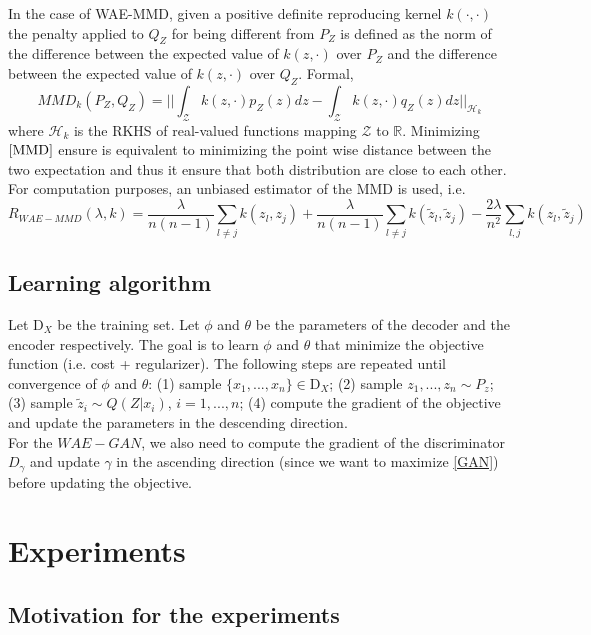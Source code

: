 \documentclass[12pt,english]{amsart}
\begin{document}
In the case of WAE-MMD, given a positive definite reproducing kernel $k(\cdot,\cdot)$ the penalty applied to $Q_Z$ for being different from $P_Z$ is defined as the norm of the difference between the expected value of $k(z,\cdot)$ over $P_Z$ and the difference between the expected value of $k(z,\cdot)$ over $Q_Z$. Formal,
\begin{equation}
 MMD_k(P_Z, Q_Z) = ||\int_{\mathcal{Z}}k(z,\cdot)p_Z(z)dz-\int_{\mathcal{Z}}k(z,\cdot)q_Z(z)dz||_{\mathcal{H}_k}
 \label{MMD}
\end{equation}
where $\mathcal{H}_k$ is the RKHS of real-valued functions mapping $\mathcal{Z}$ to $\mathbb{R}$. Minimizing $\eqref{MMD}$ ensure is equivalent to minimizing the point wise distance between the two expectation and thus it ensure that both distribution are close to each other. For computation purposes, an unbiased estimator of the MMD is used, i.e.
\begin{equation}
 R_{WAE-MMD}(\lambda, k) =
 \frac{\lambda}{n(n-1)}\sum_{l\neq j}k(z_l,z_j) +
\frac{\lambda}{n(n-1)}\sum_{l\neq j}k(\tilde{z}_l,\tilde{z}_j) -
\frac{2\lambda}{n^2}\sum_{l, j}k(z_l,\tilde{z}_j)
 \end{equation}

\subsection{Learning algorithm}
Let $\mathrm{D}_X$ be the training set. Let $\phi$ and $\theta$ be the parameters of the decoder and the encoder respectively. The goal is to learn $\phi$ and $\theta$ that minimize the objective function (i.e. cost + regularizer). The following steps are repeated until convergence of $\phi$ and $\theta$: (1) sample $\{x_1,...,x_n\}\in\mathrm{D}_X$; (2) sample $z_1,...,z_n\sim P_z$; (3) sample $\tilde{z}_i\sim Q(Z|x_i)$, $i=1,...,n$; (4) compute the gradient of the objective and update the parameters in the descending direction.\\

For the $WAE-GAN$, we also need to compute the gradient of the discriminator $D_{\gamma}$ and update $\gamma$ in the ascending direction (since we want to maximize \eqref{GAN}) before updating the objective.

\section{Experiments}

\subsection{Motivation for the experiments}
\end{document}
